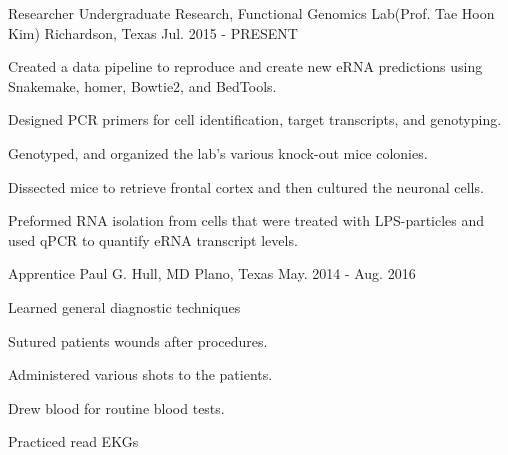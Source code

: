 \begin{cventries}
  \cventry
    {Researcher} %
    {Undergraduate Research, Functional Genomics Lab(Prof. Tae Hoon Kim)} %
    {Richardson, Texas} %
    {Jul. 2015 - PRESENT} %
    {
      \begin{cvitems} %
        \item {Created a data pipeline to reproduce and create new eRNA predictions using Snakemake, homer, Bowtie2, and BedTools.}
        \item {Designed PCR primers for cell identification, target transcripts, and genotyping.}
        \item {Genotyped, and organized the lab's various knock-out mice colonies.}
        \item {Dissected mice to retrieve frontal cortex and then cultured the neuronal cells.}
        \item {Preformed RNA isolation from cells that were treated with LPS-particles and used qPCR to quantify eRNA transcript levels.}
      \end{cvitems}
    }

  \cventry
    {Apprentice} %
    {Paul G. Hull, MD} %
    {Plano, Texas} %
    {May. 2014 - Aug. 2016} %
    {
      \begin{cvitems} %
        \item {Learned general diagnostic techniques}
        \item {Sutured patients wounds after procedures.}
        \item {Administered various shots to the patients.}
        \item {Drew blood for routine blood tests.}
        \item {Practiced read EKGs}
      \end{cvitems}
    }

\end{cventries}
